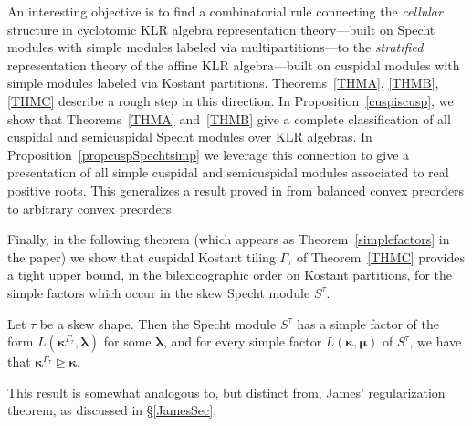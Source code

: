 \documentclass[Unicode,ALCO]{cedram}
\newcommand{\0}{{\bar 0}}
\newcommand{\blam}{\boldsymbol{\lambda}}
\newcommand{\bkap}{\boldsymbol{\kappa}}
\newcommand{\bmu}{\boldsymbol{\mu}}
\begin{document}
An interesting objective is to find a combinatorial rule connecting the {\em cellular} structure in cyclotomic KLR algebra representation theory---built on Specht modules with simple modules labeled via multipartitions---to the {\em stratified} representation theory of the affine KLR algebra---built on cuspidal modules with simple modules labeled via Kostant partitions. Theorems~\ref{THMA}, \ref{THMB}, \ref{THMC} describe a rough step in this direction. 
In Proposition~\ref{cuspiscusp}, we show that Theorems~\ref{THMA} and~\ref{THMB} give a complete classification of all cuspidal and semicuspidal Specht modules over KLR algebras. In Proposition~\ref{propcuspSpechtsimp} we leverage this connection to give a presentation of all simple cuspidal and semicuspidal modules associated to real positive roots. This generalizes a result proved in \cite{MuSkew} from balanced convex preorders to arbitrary convex preorders. 

Finally, in the following theorem (which appears as Theorem~\ref{simplefactors} in the paper) we show that cuspidal Kostant tiling \(\Gamma_\tau\) of Theorem~\ref{THMC} provides a tight upper bound, in the bilexicographic order on Kostant partitions, for the simple factors which occur in the skew Specht module \(S^\tau\). 

\begin{introtheorem}
Let \(\tau\) be a skew shape. Then the Specht module \(S^\tau\) has a simple factor of the form \(L(\bkap^{\Gamma_\tau}, \blam)\) for some \(\blam\), and for every simple factor \(L(\bkap, \bmu)\) of \(S^\tau\), we have that \(\bkap^{\Gamma_\tau} \trianglerighteq \bkap\).
\end{introtheorem}

This result is somewhat analogous to, but distinct from, James' regularization theorem, as discussed in \S\ref{JamesSec}.
\end{document}
